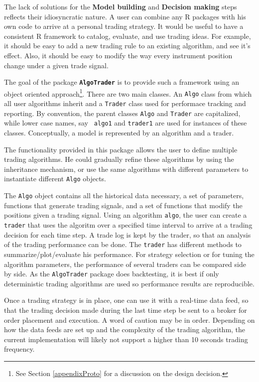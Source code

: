 \documentclass[nofootinbib]{revtex4}
\newcommand{\R}{{\normalfont\textsf{R }}{}}
\newcommand{\code}[1]{{\texttt{#1}}}
\begin{document}
The lack of solutions for the \textbf{Model building} and
\textbf{Decision making} steps reflects their idiosyncratic nature.  A
user can combine any \R packages with his own code to arrive at a 
personal trading strategy.  It would be useful to have a consistent
\R framework to catalog, evaluate, and use trading ideas.  For
example, it should be easy to add a new trading rule to an existing
algorithm, and see it's effect.  Also, it should be easy to modify the
way every instrument position change under a given trade signal. 

The goal of the package {\tt\textbf{AlgoTrader}} is to provide such a
framework using an object oriented approach\footnote{See Section
  \ref{appendixProto} for a discussion on the design decision.}.  There
are two main classes.  An {\tt Algo} class from which all user
algorithms inherit and a {\tt Trader} class used for performace
tracking and reporting.  By convention, the parent classes {\tt Algo}
and {\tt Trader} are capitalized, while lower case names, say {\tt
  algo1} and {\tt trader1} are used for instances of these classes.
Conceptually, a model is represented by an algorithm and a trader.  

The functionality provided in this package allows the user to define
multiple trading algorithms.  He could gradually refine these
algorithms by using the inheritance mechanism, or use the same
algorithms with different parameters to instantiate different
\code{Algo} objects.

The \code{Algo} object contains all the historical data necessary, a
set of parameters, functions that generate trading signals, and a set
of functions that modify the positions given a trading signal.  Using
an algorithm {\tt algo}, the user can create a {\tt trader} that uses
the algoritm over a specified time interval to arrive at a trading
decision for each time step.  A trade log is kept by the trader, so
that an analysis of the trading performance can be done.  The
\code{trader} has different methods to summarize/plot/evaluate his
performance.  For strategy selection or for tuning the algorithm
parameters, the performance of several traders can be compared side by
side.  As the \code{AlgoTrader} package does backtesting, it is best
if only deterministic trading algorithms are used so performance
results are reproducible.

Once a trading strategy is in place, one can use it with a real-time
data feed, so that the trading decision made during the last time step
be sent to a broker for order placement and execution.  A word of
caution may be in order.  Depending on how the data feeds are set up
and the complexity of the trading algorithm, the current
implementation will likely not support a higher than 10 seconds
trading frequency.  
\end{document}
